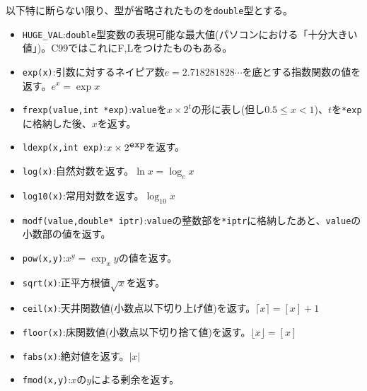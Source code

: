 以下特に断らない限り、型が省略されたものを\verb|double|型とする。
\begin{itemize}
\item \verb|HUGE_VAL|:\verb|double|型変数の表現可能な最大値(パソコンにおける「十分大きい値」)。C99ではこれにF,Lをつけたものもある。
\item \verb|exp(x)|:引数に対するネイピア数$e=2.718281828\cdots$を底とする指数関数の値を返す。$e^x=\exp x$
\item \verb|frexp(value,int *exp)|:\verb|value|を$x\times 2^t$の形に表し(但し$0.5\le x<1$)、$t$を\verb|*exp|に格納した後、$x$を返す。
\item \verb|ldexp(x,int exp)|:$x\times 2^{\verb|exp|}$を返す。
\item \verb|log(x)|:自然対数を返す。$\ln x=\log_e x$
\item \verb|log10(x)|:常用対数を返す。$\log_{10} x$
\item \verb|modf(value,double* iptr)|:\verb|value|の整数部を\verb|*iptr|に格納したあと、\verb|value|の小数部の値を返す。
\item \verb|pow(x,y)|:$x^y=\exp_x y$の値を返す。
\item \verb|sqrt(x)|:正平方根値$\sqrt{x}$を返す。
\item \verb|ceil(x)|:天井関数値(小数点以下切り上げ値)を返す。$\lceil x \rceil=[x]+1$
\item \verb|floor(x)|:床関数値(小数点以下切り捨て値)を返す。$\lfloor x \rfloor=[x]$
\item \verb|fabs(x)|:絶対値を返す。$|x|$
\item \verb|fmod(x,y)|:$x$の$y$による剰余を返す。
\end{itemize}
